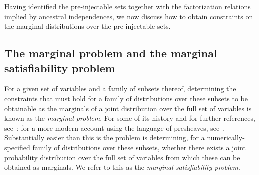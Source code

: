 {Having identified the pre-injectable sets together with the factorization relations implied by ancestral independences, we now discuss how to obtain constraints on the marginal distributions over the pre-injectable sets.

\subsection{The marginal problem and the marginal satisfiability problem}\label{step:marginalsproblem}

For a given set of variables and a family of subsets thereof, determining the constraints that must hold for a family of distributions over these subsets to be obtainable as the marginals of a joint distribution over the full set of variables is known as the {\em marginal problem}.
For some of its history and for further references, see~\cite{fritz2013marginal}; for a more modern account using the language of presheaves, see~\cite{abramsky_contextuality_2011}.
Substantially easier than this is the problem is determining, for a numerically-specified family of distributions over these subsets, whether there exists a joint probability distribution over the full set of variables from which these can be obtained as marginals.  We refer to this as the {\em marginal satisfiability problem}.



}
